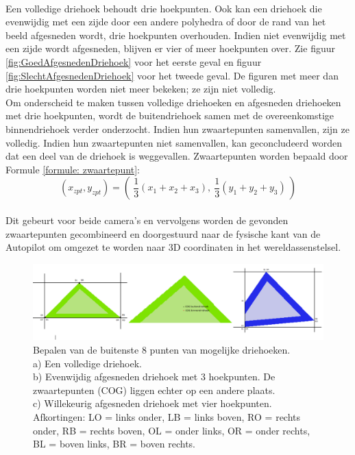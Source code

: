 \\
Een volledige driehoek behoudt drie hoekpunten. Ook kan een driehoek die evenwijdig met een zijde door een andere polyhedra of door de rand van het beeld afgesneden wordt, drie hoekpunten overhouden. Indien niet evenwijdig met een zijde wordt afgesneden, blijven er vier of meer hoekpunten over. Zie figuur \ref{fig:GoedAfgesnedenDriehoek} voor het eerste geval en figuur \ref{fig:SlechtAfgesnedenDriehoek} voor het tweede geval. De figuren met meer dan drie hoekpunten worden niet meer bekeken; ze zijn niet volledig.
\\
Om onderscheid te maken tussen volledige driehoeken en afgesneden driehoeken met drie hoekpunten, wordt de buitendriehoek samen met de overeenkomstige binnendriehoek verder onderzocht. Indien hun zwaartepunten samenvallen, zijn ze volledig. Indien hun zwaartepunten niet samenvallen, kan geconcludeerd worden dat een deel van de driehoek is weggevallen. Zwaartepunten worden bepaald door Formule \ref{formule: zwaartepunt}: \begin{equation}
\label{formule: zwaartepunt}
(x_{zpt},y_{zpt}) = ( \ \frac{1}{3}(x_1 + x_2 + x_3) , \ \frac{1}{3}(y_1 + y_2 + y_3) \ )
\end{equation}
\\
Dit gebeurt voor beide camera's en vervolgens worden de gevonden zwaartepunten gecombineerd en doorgestuurd naar de fysische kant van de Autopilot om omgezet te worden naar 3D coordinaten in het wereldassenstelsel.
\\
\begin{figure}[h]
	\centering
	\includegraphics[width=1\textwidth]{BeeldverwerkingDriehoeken.png}
	\caption{Bepalen van de buitenste 8 punten van mogelijke driehoeken. \\ a) Een volledige driehoek. \\ b) Evenwijdig afgesneden driehoek met 3 hoekpunten. De zwaartepunten (COG) liggen echter op een andere plaats. \\ c) Willekeurig afgesneden driehoek met vier hoekpunten. \\ 
	Afkortingen: LO = links onder, LB = links boven, RO = rechts onder, RB = rechts boven, OL = onder links, OR = onder rechts, BL = boven links, BR = boven rechts.}
	\label{fig:DrieGevallenDriehoeken}
\end{figure}

